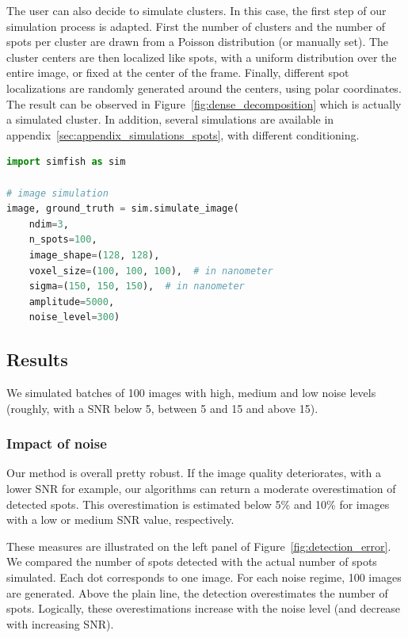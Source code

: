 The user can also decide to simulate clusters.
In this case, the first step of our simulation process is adapted.
First the number of clusters and the number of spots per cluster are drawn from a Poisson distribution (or manually set).
The cluster centers are then localized like spots, with a uniform distribution over the entire image, or fixed at the center of the frame.
Finally, different spot localizations are randomly generated around the centers, using polar coordinates.
The result can be observed in Figure~\ref{fig:dense_decomposition} which is actually a simulated cluster.
In addition, several simulations are available in appendix~\ref{sec:appendix_simulations_spots}, with different conditioning.\\

\begin{minipage}{0.9\textwidth}
\begin{lstlisting}[language=Python]
import simfish as sim

# image simulation
image, ground_truth = sim.simulate_image(
	ndim=3,
	n_spots=100,
	image_shape=(128, 128),
	voxel_size=(100, 100, 100),  # in nanometer
	sigma=(150, 150, 150),  # in nanometer
	amplitude=5000,
	noise_level=300)
\end{lstlisting}
\end{minipage}

\subsection{Results}
\label{subsec:detection_results}

We simulated batches of 100 images with high, medium and low noise levels (roughly, with a \ac{SNR} below 5, between 5 and 15 and above 15).

\subsubsection{Impact of noise}

Our method is overall pretty robust.
If the image quality deteriorates, with a lower \ac{SNR} for example, our algorithms can return a moderate overestimation of detected spots.
This overestimation is estimated below 5\% and 10\% for images with a low or medium \ac{SNR} value, respectively.

These measures are illustrated on the left panel of Figure~\ref{fig:detection_error}.
We compared the number of spots detected with the actual number of spots simulated.
Each dot corresponds to one image.
For each noise regime, 100 images are generated.
Above the plain line, the detection overestimates the number of spots.
Logically, these overestimations increase with the noise level (and decrease with increasing \ac{SNR}).

